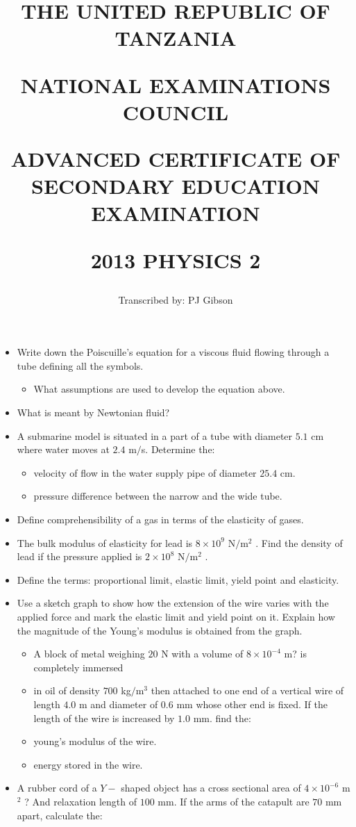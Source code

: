 \documentclass{article}
\title{THE UNITED REPUBLIC OF TANZANIA

NATIONAL EXAMINATIONS COUNCIL

ADVANCED CERTIFICATE OF SECONDARY EDUCATION EXAMINATION

\textbf{2013 PHYSICS 2}}
\author{Transcribed by:  PJ Gibson}
\begin{document}
\maketitle

\begin{itemize}
\item Write down the Poiscuille’s equation for a viscous fluid flowing through a tube defining all the symbols.
 \begin{itemize}
\item What assumptions are used to develop the equation above. 
\end{itemize}
\item What is meant by Newtonian fluid? 
\item A submarine model is situated in a part of a tube with diameter $ 5.1$ cm where water moves at $ 2.4$ m$/$s.  Determine the:
 \begin{itemize}
\item velocity of flow in the water supply pipe of diameter $ 25.4$ cm. 
\item pressure difference between the narrow and the wide tube. 
\end{itemize}
\item Define comprehensibility of a gas in terms of the elasticity of gases. 
\item The bulk modulus of elasticity for lead is $ 8 \times 10^{9}$ N$/$m$ ^{2}$ . Find the density of lead if the pressure applied is $ 2 \times 10^{8}$ N$/$m$ ^{2}$ . 
\item Define the terms: proportional limit, elastic limit, yield point and elasticity.
\item Use a sketch graph to show how the extension of the wire varies with the applied force and mark the elastic limit and yield point on it. Explain how the magnitude of the Young's modulus is obtained from the graph.
 \begin{itemize}
\item A block of metal weighing $ 20$ N with a volume of $ 8 \times 10^{-4}$ m? is completely immersed
\item in oil of density $ 700$ kg$/$m$ ^{3}$ then attached to one end of a vertical wire of length $ 4.0$ m and diameter of $ 0.6$ mm whose other end is fixed. If the length of the wire is increased by $ 1.0$ mm. find the:
\item young’s modulus of the wire. 
\item energy stored in the wire. 
\end{itemize}
\item A rubber cord of a $ Y-$ shaped object has a cross sectional area of $ 4 \times 10^{-6}$ m$ ^{2}$ ? And relaxation length of $ 100$ mm. If the arms of the catapult are $ 70$ mm apart, calculate the: 

\end{itemize}
\end{document}
